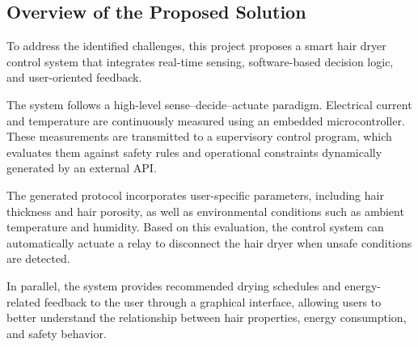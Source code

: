 \documentclass[11pt,a4paper]{article}
\begin{document}
\subsection{Overview of the Proposed Solution}
To address the identified challenges, this project proposes a smart hair dryer control system that integrates real-time sensing, software-based decision logic, and user-oriented feedback.

The system follows a high-level sense--decide--actuate paradigm. Electrical current and temperature are continuously measured using an embedded microcontroller. These measurements are transmitted to a supervisory control program, which evaluates them against safety rules and operational constraints dynamically generated by an external API.

The generated protocol incorporates user-specific parameters, including hair thickness and hair porosity, as well as environmental conditions such as ambient temperature and humidity. Based on this evaluation, the control system can automatically actuate a relay to disconnect the hair dryer when unsafe conditions are detected.

In parallel, the system provides recommended drying schedules and energy-related feedback to the user through a graphical interface, allowing users to better understand the relationship between hair properties, energy consumption, and safety behavior.
\end{document}
